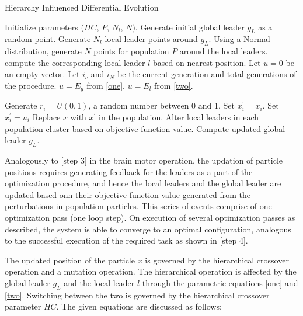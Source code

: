 \begin{algorithm}
\caption{Hierarchy Influenced Differential Evolution}
\label{algo}
\begin{algorithmic}[1]
    \State Initialize parameters ($HC$, $P$, $N_l$, $N$).
    \State Generate initial global leader $g_L$ as a random point.
    \State Generate $N_l$ local leader points around $g_L$.
    \State Using a Normal distribution, generate $N$ points for population $P$ around the local leaders.
        \State compute the corresponding local leader $l$ based on nearest position.
        \State Let $u = 0$ be an empty vector.
        \State Let $i_c$ and $i_N$ be the current generation and total generations of the procedure.
          \State $u = E_g$ from \eqref{one}.
        \Else
          \State $u = E_l$ from \eqref{two}.
        \EndIf
        
          \State Generate $r_i = U(0, 1)$, a random number between 0 and 1.
            \State Set $x_i^{'} = x_i$.
          \Else
            \State Set $x_i^{'} = u_i$
          \EndIf
        \EndFor
          \State Replace $x$ with $x^{'}$ in the population.
        \EndIf
      \EndFor
      \State Alter local leaders in each population cluster based on objective function value.
      \State Compute updated global leader $g_L$.
    \EndWhile
  \EndProcedure
\end{algorithmic}
\end{algorithm}

Analogously to [step 3] in the brain motor operation, the updation of particle positions requires generating feedback for the leaders as a part of the optimization procedure, and hence the local leaders and the global leader are updated based onn their objective function value generated from the perturbations in population particles. This series of events comprise of one optimization pass (one loop step). On execution of several optimization passes as described, the system is able to converge to an optimal configuration, analogous to the successful execution of the required task as shown in [step 4].

The updated position of the particle $x$ is governed by the hierarchical crossover operation and a mutation operation. The hierarchical operation is affected by the global leader $g_L$ and the local leader $l$ through the parametric equations \eqref{one} and \eqref{two}. Switching between the two is governed by the hierarchical crossover parameter $HC$. The given equations are discussed as follows:

